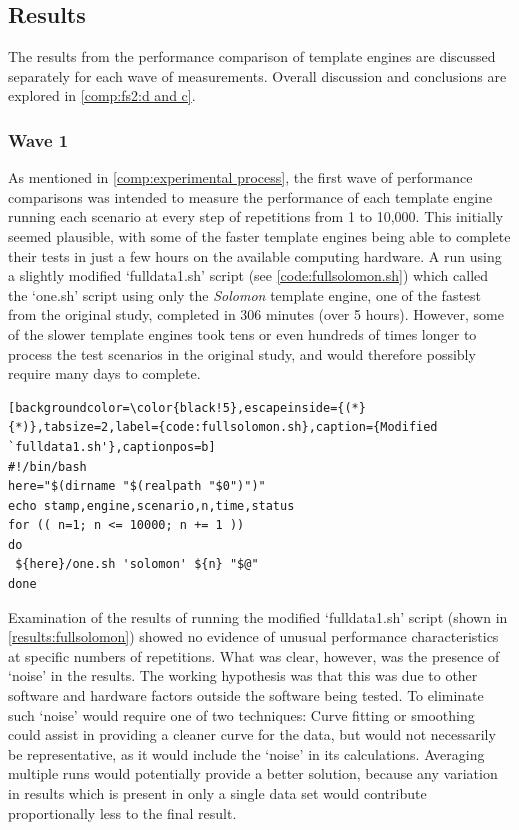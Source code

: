 \subsection{Results}
\label{fs2:results}

The results from the performance comparison of template engines are discussed separately for each wave of measurements. Overall discussion and conclusions are explored in \autoref{comp:fs2:d and c}.

\subsubsection{Wave 1}
\label{comp:wave 1}

As mentioned in \autoref{comp:experimental process}, the first wave of performance comparisons was intended to measure the performance of each template engine running each scenario at every step of repetitions from 1 to 10,000. This initially seemed plausible, with some of the faster template engines being able to complete their tests in just a few hours on the available computing hardware. A run using a slightly modified `fulldata1.sh' script  (see \autoref{code:fullsolomon.sh}) which called the `one.sh' script using only the \emph{Solomon} template engine, one of the fastest from the original study, completed in 306 minutes (over 5 hours). However, some of the slower template engines took tens or even hundreds of times longer to process the test scenarios in the original study, and would therefore possibly require many days to complete.

\begin{lstlisting}[backgroundcolor=\color{black!5},escapeinside={(*}{*)},tabsize=2,label={code:fullsolomon.sh},caption={Modified `fulldata1.sh'},captionpos=b]
#!/bin/bash
here="$(dirname "$(realpath "$0")")"
echo stamp,engine,scenario,n,time,status
for (( n=1; n <= 10000; n += 1 ))
do
 ${here}/one.sh 'solomon' ${n} "$@"
done
\end{lstlisting}

Examination of the results of running the modified `fulldata1.sh' script (shown in \autoref{results:fullsolomon}) showed no evidence of unusual performance characteristics at specific numbers of repetitions. What was clear, however, was the presence of `noise' in the results. The working hypothesis was that this was due to other software and hardware factors outside the software being tested. To eliminate such `noise' would require one of two techniques: Curve fitting or smoothing could assist in providing a cleaner curve for the data, but would not necessarily be representative, as it would include the `noise' in its calculations. Averaging multiple runs would potentially provide a better solution, because any variation in results which is present in only a single data set would contribute proportionally less to the final result.


